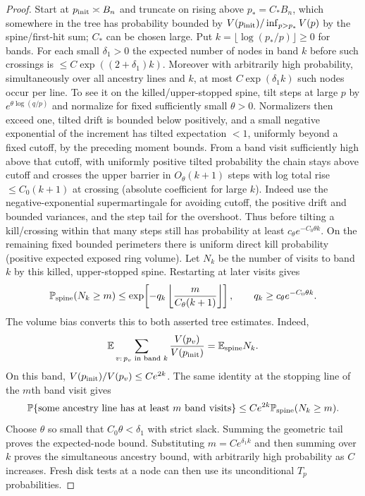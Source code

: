 \begin{proof}

Start at \(p_{\rm init}\asymp B_n\) and truncate on rising above \(p_*=C_* B_n\), which
somewhere in the tree has probability bounded by \(V(p_{\rm init})/\inf_{p>p_*}V(p)\) by
the spine/first-hit sum; \(C_*\) can be chosen large. Put
\(k=\lfloor\log(p_*/p)\rfloor\ge0\) for bands. For each small \(\delta_1>0\) the expected
number of nodes in band \(k\) before such crossings is \(\le C\exp((2+\delta_1)k)\).
Moreover with arbitrarily high probability, simultaneously over all ancestry lines and
\(k\), at most \(C\exp(\delta_1 k)\) such nodes occur per line. To see it on the
killed/upper-stopped spine, tilt steps at large \(p\) by \(e^{\theta\log(q/p)}\) and
normalize for fixed sufficiently small \(\theta>0\). Normalizers then exceed one, tilted
drift is bounded below positively, and a small negative exponential of the increment has
tilted expectation \(<1\), uniformly beyond a fixed cutoff, by the preceding moment
bounds. From a band visit sufficiently high above that cutoff, with uniformly positive
tilted probability the chain stays above cutoff and crosses the upper barrier in
\(O_\theta(k+1)\) steps with log total rise \(\le C_0(k+1)\) at crossing (absolute
coefficient for large \(k\)). Indeed use the negative-exponential supermartingale for
avoiding cutoff, the positive drift and bounded variances, and the step tail for the
overshoot. Thus before tilting a kill/crossing within that many steps still has
probability at least \(c_\theta e^{-C_0\theta k}\). On the remaining fixed bounded
perimeters there is uniform direct kill probability (positive expected exposed ring
volume). Let $N_k$ be the number of visits to band $k$ by this killed,
upper-stopped spine. Restarting at later visits gives
\[
 \mathbb P_{\rm spine}(N_k\ge m)
 \le \exp\!\left[-q_k
          \left\lfloor\frac{m}{C_\theta(k+1)}\right\rfloor\right],
 \qquad q_k\ge c_\theta e^{-C_0\theta k}.
\]
The volume bias converts this to both asserted tree estimates. Indeed,
\[
 \mathbb E\sum_{v:\,p_v\text{ in band }k}
          \frac{V(p_v)}{V(p_{\rm init})}
       =\mathbb E_{\rm spine}N_k.
\]
On this band, $V(p_{\rm init})/V(p_v)\le Ce^{2k}$.
The same identity at the stopping line of the $m$th band visit gives
\[
 \mathbb P\{\text{some ancestry line has at least }m\text{ band visits}\}
 \le Ce^{2k}\mathbb P_{\rm spine}(N_k\ge m).
\]
Choose $\theta$ so small that $C_0\theta<\delta_1$ with strict slack.
Summing the geometric tail proves the expected-node bound. Substituting
$m=Ce^{\delta_1 k}$ and then summing over $k$ proves the simultaneous
ancestry bound, with arbitrarily high probability as $C$ increases.
Fresh
disk tests at a node can then use its unconditional \(T_p\) probabilities.

\end{proof}

